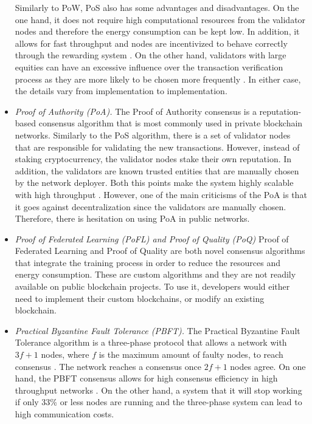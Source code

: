 \begin{itemize}
    Similarly to PoW, PoS also has some advantages and disadvantages. On the one hand, it does not require high computational resources from the validator nodes and therefore the energy consumption can be kept low. In addition, it allows for fast throughput and nodes are incentivized to behave correctly through the rewarding system \cite{li_blockchain_2021}. On the other hand, validators with large equities can have an excessive influence over the transaction verification process as they are more likely to be chosen more frequently \cite{li_blockchain_2021}. In either case, the details vary from implementation to implementation.
    
    \item \textit{Proof of Authority (PoA).} The Proof of Authority consensus is a reputation-based consensus algorithm that is most commonly used in private blockchain networks. Similarly to the PoS algorithm, there is a set of validator nodes that are responsible for validating the new transactions. However, instead of staking cryptocurrency, the validator nodes stake their own reputation. In addition, the validators are known trusted entities that are manually chosen by the network deployer. Both this points make the system highly scalable with high throughput \cite{binance_academy_2020}. However, one of the main criticisms of the PoA is that it goes against decentralization since the validators are manually chosen. Therefore, there is hesitation on using PoA in public networks.

    \item \textit{Proof of Federated Learning (PoFL) and Proof of Quality (PoQ)} Proof of Federated Learning \cite{9347812, 10.48550/arxiv.2007.15145} and Proof of Quality \cite{8843900} are both novel consensus algorithms that integrate the training process in order to reduce the resources and energy consumption. These are custom algorithms and they are not readily available on public blockchain projects. To use it, developers would either need to implement their custom blockchains, or modify an existing blockchain.

    \item \textit{Practical Byzantine Fault Tolerance (PBFT).} The Practical Byzantine Fault Tolerance algorithm is a three-phase protocol that allows a network with $3f+1$ nodes, where $f$ is the maximum amount of faulty nodes, to reach consensus \cite{Castro99practicalbyzantine}. The network reaches a consensus once $2f+1$ nodes agree. On one hand, the PBFT consensus allows for high consensus efficiency in high throughput networks \cite{li_blockchain_2021}. On the other hand, a system that it will stop working if only 33\% or less nodes are running and the three-phase system can lead to high communication costs.


\end{itemize}
